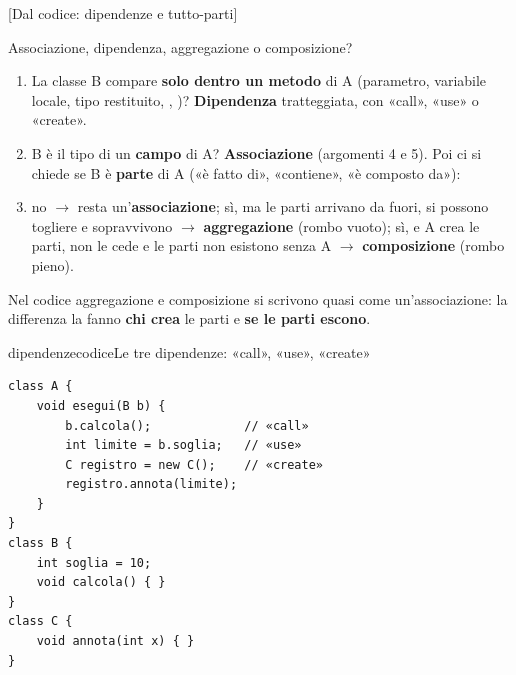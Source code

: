 [Dal codice: dipendenze e tutto-parti]

\begin{guida}{Associazione, dipendenza, aggregazione o composizione?}
\begin{enumerate}[nosep, leftmargin=*]
  \item La classe B compare \textbf{solo dentro un metodo} di A (parametro, variabile locale, tipo restituito,
        , )? \textbf{Dipendenza} tratteggiata, con «call», «use» o «create».
  \item B è il tipo di un \textbf{campo} di A? \textbf{Associazione} (argomenti 4 e 5). Poi ci si chiede se B è
        \textbf{parte} di A («è fatto di», «contiene», «è composto da»):
  \item no $\to$ resta un'\textbf{associazione}; sì, ma le parti arrivano da fuori, si possono togliere e
        sopravvivono $\to$ \textbf{aggregazione} (rombo vuoto); sì, e A crea le parti, non le cede e le parti non
        esistono senza A $\to$ \textbf{composizione} (rombo pieno).
\end{enumerate}
Nel codice aggregazione e composizione si scrivono quasi come un'associazione: la differenza la fanno
\textbf{chi crea} le parti e \textbf{se le parti escono}.
\end{guida}

\begin{caso}{dipendenzecodice}{Le tre dipendenze: «call», «use», «create»}
\begin{lstlisting}[style=javacs]
class A {
    void esegui(B b) {
        b.calcola();             // «call»
        int limite = b.soglia;   // «use»
        C registro = new C();    // «create»
        registro.annota(limite);
    }
}
class B {
    int soglia = 10;
    void calcola() { }
}
class C {
    void annota(int x) { }
}
\end{lstlisting}
\tcblower
{}
\end{caso}

